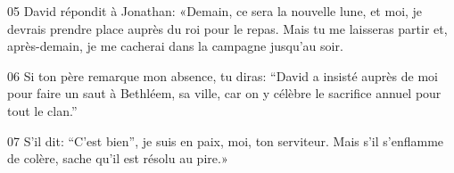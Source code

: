 
05 David répondit à Jonathan: «Demain, ce sera la nouvelle lune, et moi, je devrais prendre place auprès du roi pour le repas. Mais tu me laisseras partir et, après-demain, je me cacherai dans la campagne jusqu’au soir.

06 Si ton père remarque mon absence, tu diras: “David a insisté auprès de moi pour faire un saut à Bethléem, sa ville, car on y célèbre le sacrifice annuel pour tout le clan.”

07 S’il dit: “C’est bien”, je suis en paix, moi, ton serviteur. Mais s’il s’enflamme de colère, sache qu’il est résolu au pire.»